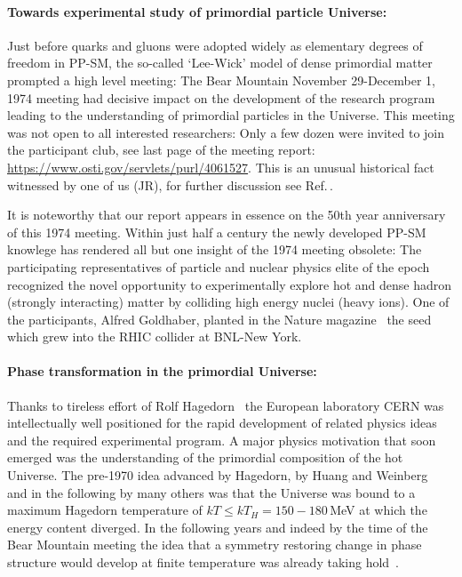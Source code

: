{\paragraph{Towards experimental study of primordial particle Universe:} Just before quarks and gluons were adopted widely as elementary degrees of freedom in PP-SM, the so-called `Lee-Wick' model of dense primordial matter prompted a high level meeting: The Bear Mountain November 29-December 1, 1974 meeting had decisive impact on the development of the research program leading to the understanding of primordial particles in the Universe. This meeting was not open to all interested researchers: Only a few dozen were invited to join the participant club, see last page of the meeting report: \url{https://www.osti.gov/servlets/purl/4061527}. This is an unusual historical fact witnessed by one of us (JR), for further discussion see Ref.\,\cite{Rafelski:2019twp}. 

It is noteworthy that our report appears in essence on the 50th year anniversary of this 1974 meeting. Within just half a century the newly developed PP-SM knowlege has rendered all but one insight of the 1974 meeting obsolete: The participating representatives of particle and nuclear physics elite of the epoch recognized the novel opportunity to experimentally explore hot and dense hadron (strongly interacting) matter by colliding high energy nuclei (heavy ions). One of the participants, Alfred Goldhaber, planted in the Nature magazine~\cite{Goldhaber:1978qp} the seed which grew into the RHIC collider at BNL-New York. 

\paragraph{Phase transformation in the primordial Universe:} Thanks to tireless effort of Rolf Hagedorn~\cite{Rafelski:2016hnq} the European laboratory CERN was intellectually well positioned for the rapid development of related physics ideas and the required experimental program. A major physics motivation that soon emerged was the understanding of the primordial composition of the hot Universe. The pre-1970 idea advanced by Hagedorn, by Huang and Weinberg~\cite{Huang:1970iq} and in the following by many others was that the Universe was bound to a maximum Hagedorn temperature of $kT\le kT_H=150-180$\,MeV at which the energy content diverged. In the following years and indeed by the time of the Bear Mountain meeting the idea that a symmetry restoring change in phase structure would develop at finite temperature was already taking hold~\cite{Weinberg:1974hy,Harrington:1974fc}.

}
